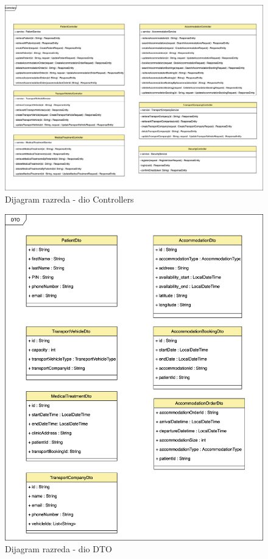 						
			\begin{figure}[H]
				\includegraphics[scale=0.10]{slike/arhitektura_controller_class_diagram.png} %
				\centering
				\caption{Dijagram razreda - dio Controllers}
				\label{fig:arhitektura_controller_class_diagram}
			\end{figure}
			
			\begin{figure}[H]
				\includegraphics[scale=0.12]{slike/arhitektura_dto_class_diagram.png} %
				\centering
				\caption{Dijagram razreda - dio DTO}
				\label{fig:arhitektura_dto_class_diagram}
			\end{figure}
			
